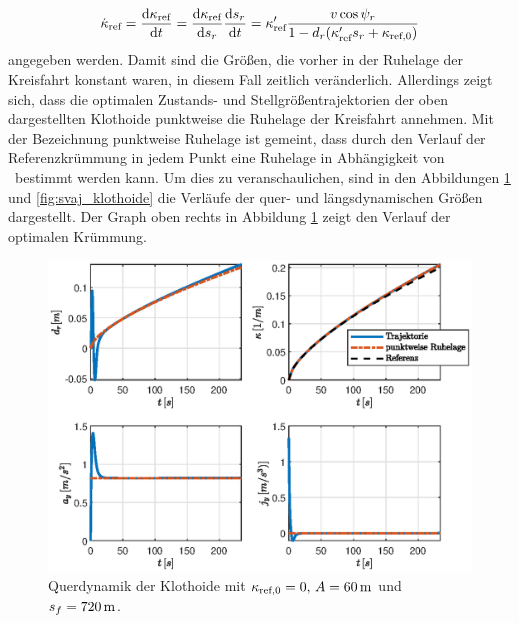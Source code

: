 \begin{equation}
	\dot{\kappa}_{\textrm{ref}} = \frac{\textrm{d}{\ensuremath{\kappa_{\textrm{ref}}}}}{\textrm{d}{t}} = \frac{\textrm{d}{\ensuremath{\kappa_{\textrm{ref}}}}}{\textrm{d}{s_r}} \frac{\textrm{d}{s_r}}{\textrm{d}{t}} = \kappa'_{\textrm{ref}} \frac{v\cos{\psi_r}}{1-d_r(\kappa'_{\textrm{ref}} s_r + \kappa_{\textrm{ref},0})}
\end{equation} 
angegeben werden. Damit sind die Größen, die vorher in der Ruhelage der Kreisfahrt konstant waren, in diesem Fall zeitlich veränderlich. Allerdings zeigt sich, dass die optimalen Zustands- und Stellgrößentrajektorien der oben dargestellten Klothoide punktweise die Ruhelage der Kreisfahrt annehmen. Mit der Bezeichnung punktweise Ruhelage ist gemeint, dass durch den Verlauf der Referenzkrümmung in jedem Punkt eine Ruhelage in Abhängigkeit von \kapparefofs~bestimmt werden kann. Um dies zu veranschaulichen, sind in den Abbildungen \ref{fig:lat_dyn_klothoide} und \ref{fig:svaj_klothoide} die Verläufe der quer- und längsdynamischen Größen dargestellt. Der Graph oben rechts in Abbildung \ref{fig:lat_dyn_klothoide} zeigt den Verlauf der optimalen Krümmung. 
\begin{figure}[h] 
	\centering
	\includegraphics[width=\linewidth]{./Bilder/Ergebnisse/Klothoide/lat_dyn.eps}
	\caption{Querdynamik der Klothoide mit $\kappa_{\textrm{ref},0} = 0,\, A = 60\,\mathrm{m}$ und $s_f = 720\,\mathrm{m}$.}
	\label{fig:lat_dyn_klothoide}
\end{figure} 
